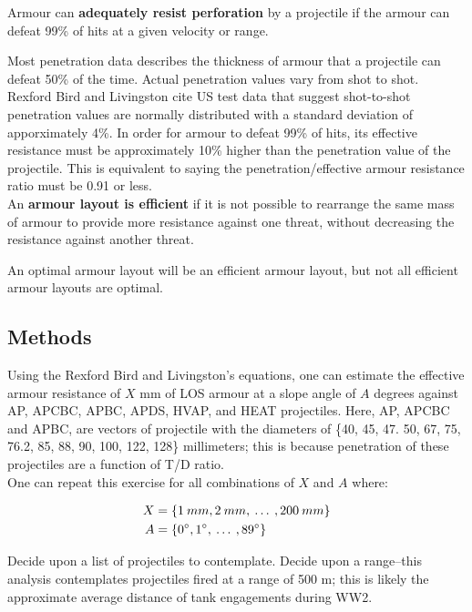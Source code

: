 \documentclass[]{article}
\begin{document}
\noindent Armour can \textbf{adequately resist perforation} by a projectile if the armour can defeat 99\% of hits at a given velocity or range.

Most penetration data describes the thickness of armour that a projectile can defeat 50\% of the time. Actual penetration values vary from shot to shot. Rexford Bird and Livingston cite US test data that suggest shot-to-shot penetration values are normally distributed with a standard deviation of apporximately 4\%. In order for armour to defeat 99\% of hits, its effective resistance must be approximately 10\% higher than the penetration value of the projectile. This is equivalent to saying the penetration/effective armour resistance ratio must be 0.91 or less.
\\

\noindent An \textbf{armour layout is efficient} if it is not possible to rearrange the same mass of armour to provide more resistance against one threat, without decreasing the resistance against another threat.

An optimal armour layout will be an efficient armour layout, but not all efficient armour layouts are optimal.

\subsection{Methods}
Using the Rexford Bird and Livingston’s equations, one can estimate the effective armour resistance of $X$ mm of LOS armour at a slope angle of $A$ degrees against AP, APCBC, APBC, APDS, HVAP, and HEAT projectiles. Here, AP, APCBC and APBC, are vectors of projectile with the diameters of \{40, 45, 47. 50, 67, 75, 76.2, 85, 88, 90, 100, 122, 128\} millimeters; this is because penetration of these projectiles are a function of T/D ratio.
\\

\noindent One can repeat this exercise for all combinations of $X$ and $A$ where:

\begin{align*}
X &= \{1\:mm, 2\:mm,\: \dots \:, 200\:mm\} \\
A &= \{0\degree, 1\degree,\: \dots \:, 89\degree \}
\end{align*}

\noindent Decide upon a list of projectiles to contemplate. Decide upon a range--this analysis contemplates projectiles fired at a range of 500 m; this is likely the approximate average distance of tank engagements during WW2.
\end{document}
